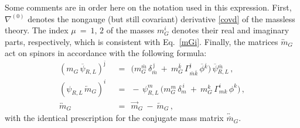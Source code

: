 \documentclass[12pt]{article}
\newcommand{\ov}{\overline}
\newcommand{\bpsi}{\ov{\psi}{}}
\newcommand{\bphi}{\ov{\phi}{}}
\newcommand{\bj}{{\bar \jmath}}
\newcommand{\bk}{{\bar k}}
\newcommand{\bm}{{\bar m}}
\begin{document}
	Some comments are in order here on the notation used in this expression. First,
	  $ \nabla^{(0)} $ denotes the nongauge (but still covariant) derivative \eqref{covd}
	of the massless theory.
	The index $ \mu ~=~ 1,\, 2$ of the masses $ m_G^i $ denotes their real and imaginary parts, respectively,
	which is consistent with Eq.~\eqref{mGi}.
	Finally, the matrices $ \overleftrightarrow{m}{}_{\!G} $ act on   spinors in accordance with
	the following formula:
\begin{align*}
%
	(m_G\, \bpsi_{R,L})^\bj & ~~=~~ 
		\bigl( m_G^\bm\, \delta_{\bm}^{~\bj} ~+~ m_G^\bk\, \Gamma^\bj_{\bm\bk}\, \bphi^\bk \bigr)\, \bpsi_{R,L}^\bm\,,
	\\[2mm]
%
	(\psi_{R,L}\,\overleftarrow{m}{}_{\!G})^i & ~~=~~
		-\, \psi_{R,L}^m\, \bigl( m_G^m\, \delta_m^{~i} ~+~ m_G^k\, \Gamma^i_{mk}\, \phi^k \bigr)\,,
	\\[2mm]
%
	\overleftrightarrow{m}{}_{\!G} & ~~=~~ \overrightarrow{m}{}_{\!G} ~-~ \overleftarrow{m}{}_{\!G}\,,
\end{align*}
	with the identical prescription for the conjugate mass matrix $ \overleftrightarrow{\ov{m}}{}_{\!G} $.
\end{document}
